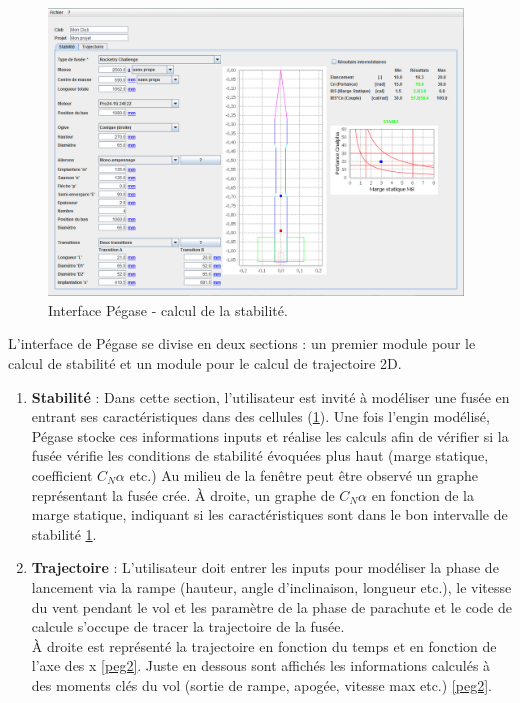 \documentclass[a4paper]{article}
\begin{document}
\begin{figure}[!htbp]
\begin{center}
\includegraphics[width=11cm]{pegase.PNG} 
\end{center}
\caption{Interface Pégase - calcul de la stabilité.}
\label{peg1}
\end{figure}


L'interface de Pégase se divise en deux sections : un premier module pour le calcul de stabilité et un module pour le calcul de trajectoire 2D.


\begin{enumerate}
\item \textbf{Stabilité} : Dans cette section, l'utilisateur est invité à modéliser une fusée en entrant ses caractéristiques dans des cellules (\ref{peg1}). Une fois l'engin modélisé, Pégase stocke ces informations inputs et réalise les calculs afin de vérifier si la fusée vérifie les conditions de stabilité évoquées plus haut (marge statique, coefficient $C_{N}\alpha$ etc.) Au milieu de la fenêtre peut être observé un graphe représentant la fusée crée. À droite, un graphe de $C_{N}\alpha$ en fonction de la marge statique, indiquant si les caractéristiques sont dans le bon intervalle de stabilité \ref{peg1}.

\item \textbf{Trajectoire} : L'utilisateur doit entrer les inputs pour modéliser la phase de lancement via la rampe (hauteur, angle d'inclinaison, longueur etc.), le vitesse du vent pendant le vol  et les paramètre de la phase de parachute et le code de calcule s'occupe de tracer la trajectoire de la fusée.\\

À droite est représenté la trajectoire en fonction du temps et en fonction de l'axe des x \ref{peg2}. Juste en dessous sont affichés les informations calculés à des moments clés du vol (sortie de rampe, apogée, vitesse max etc.) \ref{peg2}.

\end{enumerate}
\end{document}
